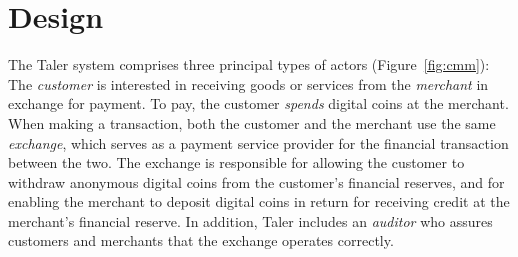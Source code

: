 \documentclass{llncs}
\begin{document}







\section{Design}

The Taler system comprises three principal types of actors
(Figure~\ref{fig:cmm}): The \emph{customer} is interested in receiving
goods or services from the \emph{merchant} in exchange for payment.
To pay, the customer {\em spends} digital coins at the merchant.  When
making a transaction, both the customer and the merchant use the same
\emph{exchange}, which serves as a payment service provider for the
financial transaction between the two.  The exchange is responsible
for allowing the customer to withdraw anonymous digital coins from the
customer's financial reserves, and for enabling the merchant to
deposit digital coins in return for receiving credit at the merchant's
financial reserve.  In addition, Taler includes an \emph{auditor} who
assures customers and merchants that the exchange operates correctly.
\end{document}
